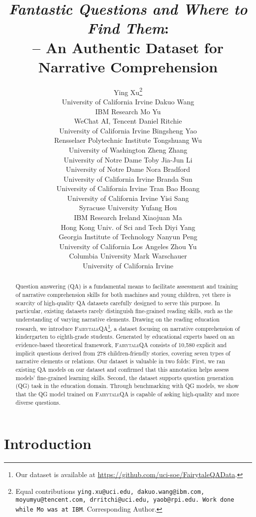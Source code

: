 \documentclass[11pt]{article}
\title{\textit{Fantastic Questions and Where to Find Them}:\\ 
\datasetname \xspace-- An Authentic Dataset for Narrative Comprehension}
\author{
Ying Xu\thanks{Equal contributions \texttt{ying.xu@uci.edu, dakuo.wang@ibm.com, moyumyu@tencent.com, drritchi@uci.edu, yaob@rpi.edu. Work done while Mo was at IBM}.  Corresponding Author.} \\ \small{University of California Irvine}
\And Dakuo Wang \\ \small{IBM Research}
\And Mo Yu \\ \small{WeChat AI, Tencent}
\AND Daniel Ritchie \\ \small{University of California Irvine}
\And Bingsheng Yao \\ \small{Rensselaer Polytechnic Institute}
\And Tongshuang Wu \\ \small{University of Washington}
\AND Zheng Zhang \\ \small{University of Notre Dame}
\And Toby Jia-Jun Li \\ \small{University of Notre Dame}
\And Nora Bradford \\ \small{University of California Irvine}
\AND Branda Sun \\ \small{University of California Irvine}
\And Tran Bao Hoang \\ \small{University of California Irvine}
\And Yisi Sang \\ \small{Syracuse University}
\AND Yufang Hou \\ \small{IBM Research Ireland}
\And Xiaojuan Ma \\ \small{Hong Kong Univ. of Sci and Tech}
\And Diyi Yang \\ \small{Georgia Institute of Technology}
\AND Nanyun Peng \\ \small{University of California Los Angeles}
\And Zhou Yu \\ \small{Columbia University}
\And Mark Warschauer \\ \small{University of California Irvine}
}
\newcommand{\datasetname}{\textsc{FairytaleQA}\xspace}
\begin{document}
\maketitle
\begin{abstract}
Question answering (QA) is a fundamental means to facilitate assessment and training of narrative comprehension skills for both machines and young children, yet there is scarcity of high-quality QA datasets carefully designed to serve this purpose. In particular, existing datasets rarely distinguish fine-grained reading skills, such as the understanding of varying narrative elements. 
Drawing on the reading education research, we introduce \datasetname \footnote{Our dataset is available at \url{https://github.com/uci-soe/FairytaleQAData}.}, a dataset focusing on narrative comprehension of kindergarten to eighth-grade students. Generated by educational experts based on an evidence-based theoretical framework, \datasetname consists of 10,580 explicit and implicit questions derived from 278 children-friendly stories, covering seven types of narrative elements or relations. Our dataset is valuable in two folds: First, we ran existing QA models on our dataset and confirmed that this annotation helps assess models' fine-grained learning skills. Second, the dataset supports question generation (QG) task in the education domain. Through benchmarking with QG models, we show that the QG model trained on \datasetname is capable of asking high-quality and more diverse questions. 


\end{abstract}

\newcommand{\labelstr}[1]{{ \color{clabel} \texttt{#1}}}
\section{Introduction}
\end{document}
